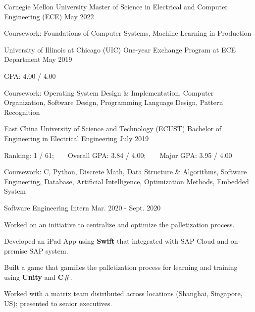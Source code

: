 \documentclass[12pt, a4paper]{yp-vita}
\begin{document}
    \makename
    \makecontact{\myemail}{\mymobile}{\mygithub}{\mylinkedin}
    \medskip

    \mentry
        {Carnegie Mellon University}
        {Master of Science in Electrical and Computer Engineering (ECE)}
        {May 2022}
        {
            \begin{cvitems}
                \item {Coursework: Foundations of Computer Systems, Machine Learning in Production}
            \end{cvitems}
        }
    \smallskip

    \mentry
        {University of Illinois at Chicago (UIC)}
        {One-year Exchange Program at ECE Department}
        {May 2019}
        {
            \begin{cvitems} %
              \item {GPA: 4.00 / 4.00}
              \item {Coursework: Operating System Design \& Implementation, Computer Organization, Software Design, Programming Language Design, Pattern Recognition}
            \end{cvitems}
          }
    
    \smallskip

    \mentry
        {East China University of Science and Technology (ECUST)}
        {Bachelor of Engineering in Electrical Engineering}
        {July 2019}
        {
            \begin{cvitems} %
                \item {Ranking: 1 / 61;~~~~Overall GPA: 3.84 / 4.00;~~~~Major GPA: 3.95 / 4.00}
                \item {Coursework: C, Python, Discrete Math, Data Structure \& Algorithms, Software Engineering, Database, Artificial Intelligence, Optimization Methods, Embedded System}
            \end{cvitems}
        }
    
    \vfill

    {Software Engineering Intern}
    {Mar. 2020 - Sept. 2020}
    {
        \begin{cvitems}
            \item Worked on an initiative to centralize and optimize the palletization process. 
            \item Developed an iPad App using \textbf{Swift} that integrated with SAP Cloud and on-premise SAP system.
            \item Built a game that gamifies the palletization process for learning and training using \textbf{Unity} and \textbf{C\#}.
            \item Worked with a matrix team distributed across locations (Shanghai, Singapore, US); presented to senior executives.
        \end{cvitems}
    }
\end{document}
